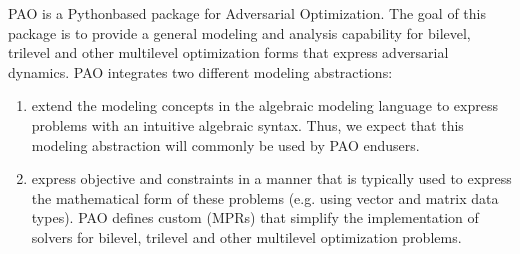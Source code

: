 PAO is a Python\sphinxhyphen{}based package for Adversarial Optimization.  The goal of
this package is to provide a general modeling and analysis capability for
bilevel, trilevel and other multilevel optimization forms that express
adversarial dynamics.  PAO integrates two different modeling abstractions:
\begin{enumerate}
%
\item {}
 extend the modeling concepts in the
 algebraic modeling language
to express problems with an intuitive algebraic syntax.  Thus, we
expect that this modeling abstraction will commonly be used by PAO
end\sphinxhyphen{}users.

\item {}
 express objective and constraints in a manner
that is typically used to express the mathematical form of these
problems (e.g. using vector and matrix data types).  PAO defines
custom  (MPRs) that simplify the
implementation of solvers for bilevel, trilevel and other multilevel
optimization problems.

\end{enumerate}
